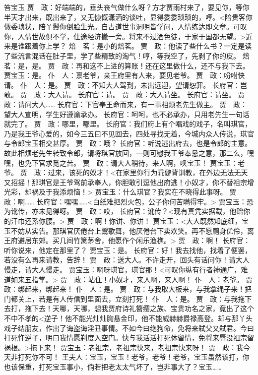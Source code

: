\documentclass{article}
\begin{document}
笞宝玉
贾　政：好端端的，垂头丧气做什么呀？方才贾雨村来了，要见你，等你半天才出来，既出来了，又无慷慨潇洒的谈吐，显得委委琐琐的，哼。<陪贵客你做委琐状，陪丫鬟你倒脸生光。自古道世事洞明皆学问，人情练达即文章。可叹你，人情世故俱不学，仕途经济撇一旁。将来不过酒色徒，于家于国都无望。>近来是谁跟着你上学？
焙　茗：是小的焙茗。
贾　政：他读了些什么书？一定是读了些流言混话在肚子里，学了些精致的淘气！哼，等我空了，先剥了你的皮。
焙　茗：是，是。
贾　政：再和这不上进的算账！还在这里做什么，还不与我下去。
贾宝玉：是。
仆　人：禀老爷，亲王府里有人来，要见老爷。
贾　政：吩咐快请。
仆　人：是。
贾　政：不知大人驾到，未出远迎，望请恕罪。
长府官：岂敢。
贾　政：大人请。
长府官：请。
贾　政：大人请坐。
长府官：请坐。
贾　政：请问大人……
长府官：下官奉王命而来，有一事相烦老先生做主。
贾　政：望大人宣明，学生好遵谕承办。
长府官：呵呵，也不必承办，只用老先生一句话就完了。
贾　政：哪里，哪里。
长府官：我们府上有个唱戏的戏子，名叫琪官，乃是我王爷心爱的，如今三五曰不见回去，四处寻找无着，今城内众人传说，琪官与令郎宝玉相交甚厚。
贾　政：哦？
长府官：听说逃出府去，也是令郎的主意。故此相烦老先生转致令郎，请将琪官放回，一则可慰我王爷奉恳之意，那二么，嘿嘿，也免下官求觅之苦。
贾　政：请大人稍待，来人啊，唤宝玉！
贾宝玉：老爷。
贾　政：过来，该死的奴才！<在家里你行为乖僻背训教，在外边无法无天又招摇！那琪官是王爷驾前承奉人，你胆敢引逗他出府逃！小奴才，你不替祖宗增光彩，却祸及于我添烦恼！>
贾宝玉：什么琪官？我实在不晓得此事呀。
贾　政：啊……
长府官：嘿嘿……<白纸难把烈火包，公子你何苦瞒得牢。>
贾宝玉：恐为讹传，亦未见得呀。
贾　政：哎，
长府官：讹传？<现有真凭实据载，他赠你的汗巾还系你腰。>
贾　政：啊！你讲、你讲！
贾宝玉：<大人既然知底细，宝玉不妨从实告。那琪官厌倦台上鬻歌舞，他厌倦台下卖欢笑。再不愿厕身优伶，离王府避居东郊。买几间竹篱茅舍，他愿作个闲乐渔樵。>
贾　政：啊！
长府官：听你说来，他定在那里了？
贾宝玉：是。
长府官：好！我去找他，找着了便罢，若没有么再来请教，告辞！
贾　政：送大人。不许走开，回头有话问你！请大人慢走，请大人慢走。
贾宝玉：啊呀琪官，琪官那！<可叹你纵有行者神通广，难道如来五指掌。>
贾　政：站住！小奴才，来人啊，来人啊！
仆　人：老爷。
贾　政：绑起来，绑起来！
仆　人：是。
贾　政：与我取大板来，与我拿绳子来！把门都关上，若是有人传信到里面去，立刻打死！
仆　人：是。
贾　政：与我拖下去打，拖下去！天哪，天哪，想我贾府诗礼簪缨之族、宝贵功名之家，竟出了这个不中不孝的<逆子！他不能光灿灿胸悬金印，他不能威赫赫爵禄高登。却与那丫头戏子结朋友，作出了诲盗诲淫丑事情。不如今曰绝狗命，免将来弑父又弑君。今曰打死忤逆子，明曰我情愿剃度入空门。快与我活活打死休留情，免将来辱没祖宗留祸根。>拖下来！
贾宝玉：老祖宗，老祖宗快来，老祖宗快来呀！
贾　政：我今天非打死你不可！
王夫人：宝玉，宝玉！老爷，老爷！老爷，宝玉虽然该打，你也该保重，打死宝玉事小，倘若把老太太气坏了，岂非事大了？宝玉……
\end{document}
